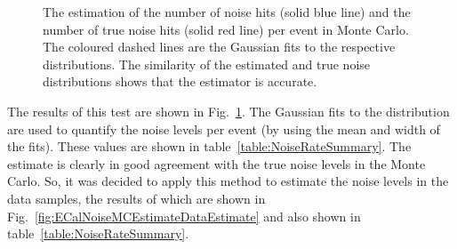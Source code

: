 \begin{figure}%
  \centering
  \hspace{1em}
  \caption{The estimation of the number of noise hits (solid blue line) and the number of true noise hits (solid red line) per event in Monte Carlo.  The coloured dashed lines are the Gaussian fits to the respective distributions.  The similarity of the estimated and true noise distributions shows that the estimator is accurate.}
  \label{fig:ECalNoiseMCEstimateMCTrue}
\end{figure}
The results of this test are shown in Fig.~\ref{fig:ECalNoiseMCEstimateMCTrue}.  The Gaussian fits to the distribution are used to quantify the noise levels per event (by using the mean and width of the fits).  These values are shown in table~\ref{table:NoiseRateSummary}.  The estimate is clearly in good agreement with the true noise levels in the Monte Carlo.  So, it was decided to apply this method to estimate the noise levels in the data samples, the results of which are shown in Fig.~\ref{fig:ECalNoiseMCEstimateDataEstimate} and also shown in table~\ref{table:NoiseRateSummary}.
